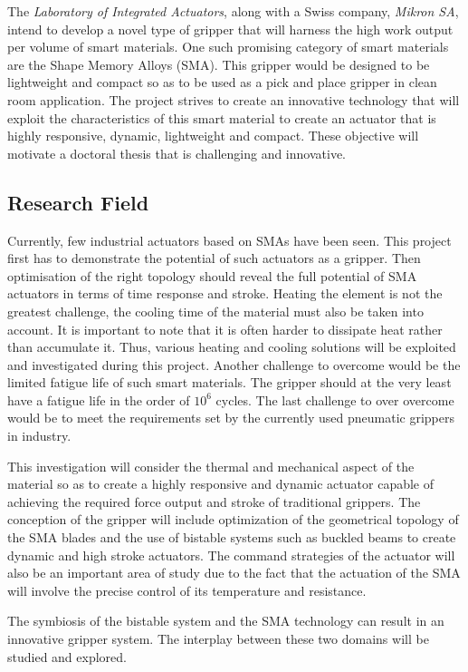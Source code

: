 The \emph{Laboratory of Integrated Actuators}, along with a Swiss company, \emph{Mikron SA}, intend to develop a novel type of gripper that will harness the high work output per volume of smart materials. One such promising category of smart materials are the Shape Memory Alloys (SMA). This gripper would be designed to be lightweight and compact so as to be used as a pick and place gripper in clean room application. The project strives to create an innovative technology that will exploit the characteristics of this smart material to create an actuator that is highly responsive, dynamic, lightweight and compact. These objective will motivate a doctoral thesis that is challenging and innovative.

\subsection{Research Field}\label{subsec:research_field}
Currently, few industrial actuators based on SMAs have been seen. This project first has to demonstrate the potential of such actuators as a gripper. Then optimisation of the right topology should reveal the full potential of SMA actuators in terms of time response and stroke. Heating the element is not the greatest challenge, the cooling time of the material must also be taken into account. It is important to note that it is often harder to dissipate heat rather than accumulate it. Thus, various heating and cooling solutions will be exploited and investigated during this project. Another challenge to overcome would be the limited fatigue life of such smart materials. The gripper should at the very least have a fatigue life in the order of $10^6$ cycles. The last challenge to over overcome would be to meet the requirements set by the currently used pneumatic grippers in industry.

This investigation will consider the thermal and mechanical aspect of the material so as to create a highly responsive and dynamic actuator capable of achieving the required force output and stroke of traditional grippers. The conception of the gripper will include optimization of the geometrical topology of the SMA blades and the use of bistable systems such as buckled beams to create dynamic and high stroke actuators. The command strategies of the actuator will also be an important area of study due to the fact that the actuation of the SMA will involve the precise control of its temperature and resistance.

The symbiosis of the bistable system and the SMA technology can result in an innovative gripper system. The interplay between these two domains will be studied and explored.

